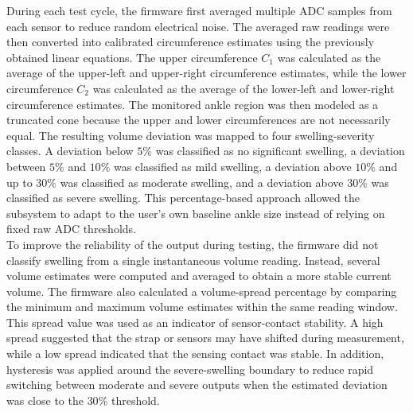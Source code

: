 \noindent During each test cycle, the firmware first averaged multiple ADC samples from each sensor to reduce random electrical noise. The averaged raw readings were then converted into calibrated circumference estimates using the previously obtained linear equations. The upper circumference $C_1$ was calculated as the average of the upper-left and upper-right circumference estimates, while the lower circumference $C_2$ was calculated as the average of the lower-left and lower-right circumference estimates. The monitored ankle region was then modeled as a truncated cone because the upper and lower circumferences are not necessarily equal. The resulting volume deviation was mapped to four swelling-severity classes. A deviation below $5\%$ was classified as no significant swelling, a deviation between $5\%$ and $10\%$ was classified as mild swelling, a deviation above $10\%$ and up to $30\%$ was classified as moderate swelling, and a deviation above $30\%$ was classified as severe swelling. This percentage-based approach allowed the subsystem to adapt to the user’s own baseline ankle size instead of relying on fixed raw ADC thresholds. \\

\noindent To improve the reliability of the output during testing, the firmware did not classify swelling from a single instantaneous volume reading. Instead, several volume estimates were computed and averaged to obtain a more stable current volume. The firmware also calculated a volume-spread percentage by comparing the minimum and maximum volume estimates within the same reading window. This spread value was used as an indicator of sensor-contact stability. A high spread suggested that the strap or sensors may have shifted during measurement, while a low spread indicated that the sensing contact was stable. In addition, hysteresis was applied around the severe-swelling boundary to reduce rapid switching between moderate and severe outputs when the estimated deviation was close to the $30\%$ threshold. \\











